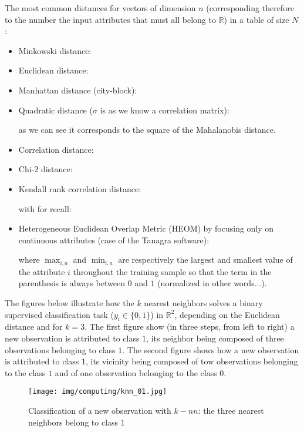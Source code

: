 	The most common distances for vectors of dimension $n$ (corresponding therefore to the number the input attributes that must all belong to $\mathbb{R}$) in a table of size $N$:
	\begin{itemize}
		\item Minkowski distance:
		
		
		\item Euclidean distance:
		
	
		\item Manhattan distance (city-block):
		
	
		\item Quadratic distance ($\sigma$ is as we know a correlation matrix):
		
		as we can see it corresponds to the square of the Mahalanobis distance.
	
		\item Correlation distance:
		
	
		\item Chi-$2$ distance:
		
	
		\item Kendall rank correlation distance:
		
		with for recall:
		
	
		\item Heterogeneous Euclidean Overlap Metric (HEOM) by focusing only on continuous attributes (case of the Tanagra software):
		
		where $\max_{i,a}$ and $\min_{i,a}$ are respectively the largest and smallest value of the attribute $i$ throughout the training sample so that the term in the parenthesis is always between $0$ and $1$ (normalized in other words...).
	\end{itemize}
	The figures below illustrate how the $k$ nearest neighbors solves a binary supervised classification task ($y_i\in \{0,1\}$) in $\mathbb{R}^2$, depending on the Euclidean distance and for $k = 3$. The first figure show (in three steps, from left to right) a new observation is attributed to class $1$, its neighbor being composed of three observations belonging to class $1$. The second figure shows how a new observation is attributed to class $1$, its vicinity being composed of tow observations belonging to the class $1$ and of one observation belonging to the class $0$.
	\begin{figure}[H]
		\centering
		\texttt{[image: img/computing/knn\_01.jpg]}
		\caption[Classification of a new observation with $k-nn$]{Classification of a new observation with $k-nn$: the three nearest neighbors belong to class $1$}
	\end{figure}
